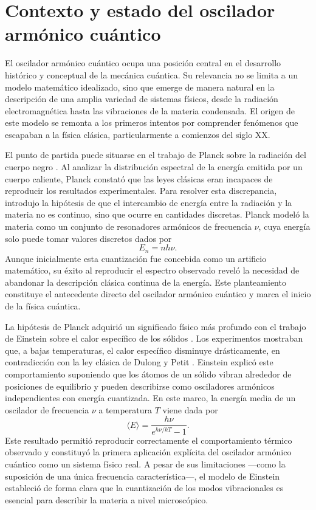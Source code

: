 \documentclass[11pt,a4paper,spanish]{book}
\begin{document}
\chapter{Contexto y estado del oscilador armónico cuántico}\label{contexto}

El oscilador armónico cuántico ocupa una posición central en el desarrollo histórico y conceptual de la mecánica cuántica. Su relevancia no se limita a un modelo matemático idealizado, sino que emerge de manera natural en la descripción de una amplia variedad de sistemas físicos, desde la radiación electromagnética hasta las vibraciones de la materia condensada. El origen de este modelo se remonta a los primeros intentos por comprender fenómenos que escapaban a la física clásica, particularmente a comienzos del siglo XX.

El punto de partida puede situarse en el trabajo de Planck sobre la radiación del cuerpo negro \citep{planck1901}. Al analizar la distribución espectral de la energía emitida por un cuerpo caliente, Planck constató que las leyes clásicas eran incapaces de reproducir los resultados experimentales. Para resolver esta discrepancia, introdujo la hipótesis de que el intercambio de energía entre la radiación y la materia no es continuo, sino que ocurre en cantidades discretas. Planck modeló la materia como un conjunto de resonadores armónicos de frecuencia $\nu$, cuya energía solo puede tomar valores discretos dados por
\[
E_n = n h \nu .
\]
Aunque inicialmente esta cuantización fue concebida como un artificio matemático, su éxito al reproducir el espectro observado reveló la necesidad de abandonar la descripción clásica continua de la energía. Este planteamiento constituye el antecedente directo del oscilador armónico cuántico y marca el inicio de la física cuántica.

La hipótesis de Planck adquirió un significado físico más profundo con el trabajo de Einstein sobre el calor específico de los sólidos \citep{einstein1907}. Los experimentos mostraban que, a bajas temperaturas, el calor específico disminuye drásticamente, en contradicción con la ley clásica de Dulong y Petit \citep{dulong1819}. Einstein explicó este comportamiento suponiendo que los átomos de un sólido vibran alrededor de posiciones de equilibrio y pueden describirse como osciladores armónicos independientes con energía cuantizada. En este marco, la energía media de un oscilador de frecuencia $\nu$ a temperatura $T$ viene dada por
\[
\langle E \rangle = \frac{h\nu}{e^{h\nu/kT}-1}.
\]
Este resultado permitió reproducir correctamente el comportamiento térmico observado y constituyó la primera aplicación explícita del oscilador armónico cuántico como un sistema físico real. A pesar de sus limitaciones —como la suposición de una única frecuencia característica—, el modelo de Einstein estableció de forma clara que la cuantización de los modos vibracionales es esencial para describir la materia a nivel microscópico.
\end{document}
